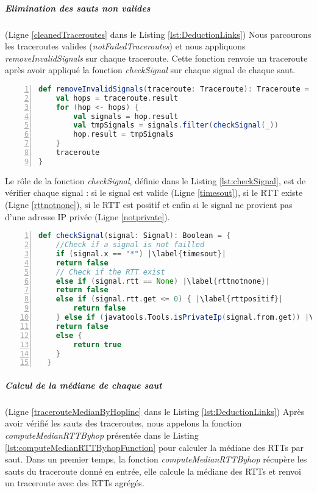 \subparagraph{Elimination des sauts non valides} (Ligne \ref{cleanedTraceroutes} dans le Listing \ref{lst:DeductionLinks}) Nous parcourons les traceroutes valides (\textit{notFailedTraceroutes}) et nous appliquons  \textit{removeInvalidSignals} sur chaque traceroute. Cette fonction renvoie un traceroute après avoir appliqué la fonction \textit{checkSignal} sur chaque signal de chaque saut. 

\begin{lstlisting}[language=scala,firstnumber=1, caption={Définition de la méthode removeInvalidSignals},label={lst:removeInvalidSignals}, basicstyle = \footnotesize,escapechar=|,numbers=left,
stepnumber=1]
  def removeInvalidSignals(traceroute: Traceroute): Traceroute = {
	val hops = traceroute.result
	for (hop <- hops) {
		val signals = hop.result
		val tmpSignals = signals.filter(checkSignal(_))
		hop.result = tmpSignals
	}
	traceroute
}
\end{lstlisting}

Le rôle de la fonction \textit{checkSignal}, définie dans le Listing \ref{lst:checkSignal},  est de vérifier chaque signal : si le signal est valide (Ligne \ref{timesout}), si le RTT existe (Ligne \ref{rttnotnone}), si le RTT est positif \label{rttpositif} et enfin si le signal ne provient pas d'une adresse IP privée (Ligne \ref{notprivate}).

\begin{lstlisting}[language=scala,firstnumber=1, caption={Définition de la méthode checkSignal},label={lst:checkSignal}, basicstyle = \footnotesize,escapechar=|,numbers=left,
stepnumber=1]
  def checkSignal(signal: Signal): Boolean = {
	//Check if a signal is not failled
	if (signal.x == "*") |\label{timesout}|
	return false
	// Check if the RTT exist
	else if (signal.rtt == None) |\label{rttnotnone}|
	return false
	else if (signal.rtt.get <= 0) { |\label{rttpositif}|
		return false
	} else if (javatools.Tools.isPrivateIp(signal.from.get)) |\label{notprivate}|
	return false
	else {
		return true
	}
  }
\end{lstlisting}

\subparagraph{Calcul de la médiane de chaque saut} (Ligne \ref{tracerouteMedianByHopline} dans le Listing \ref{lst:DeductionLinks})
Après avoir vérifié les sauts des traceroutes, nous appelons la fonction \textit{computeMedianRTTByhop}  présentée dans le Listing \ref{lst:computeMedianRTTByhopFunction} pour calculer la médiane des RTTs par saut. Dans un premier temps, la fonction \textit{computeMedianRTTByhop} récupère les sauts du traceroute donné en entrée, elle calcule la médiane des RTTs et renvoi un traceroute avec des RTTs agrégés. 

